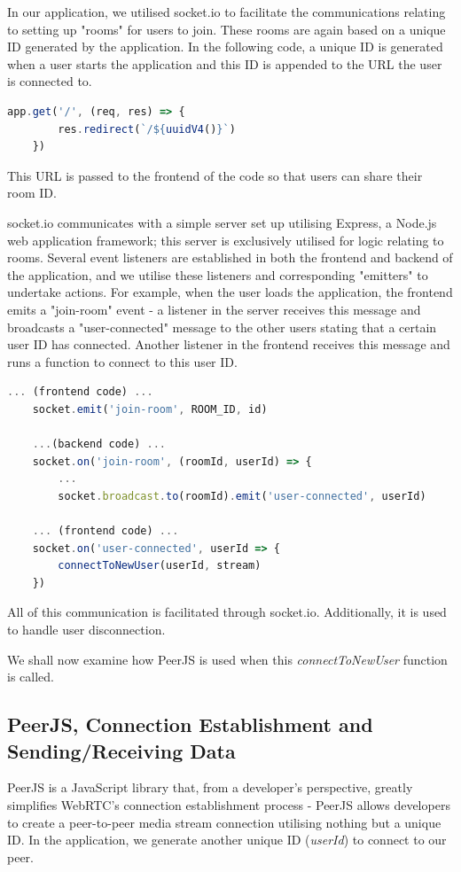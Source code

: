 In our application, we utilised socket.io to facilitate the communications relating to setting up "rooms" for users to join. These rooms are again based on a unique ID generated by the application. In the following code, a unique ID is generated when a user starts the application and this ID is appended to the URL the user is connected to.

\begin{lstlisting}[language=javascript, caption={A unique ID is generated and added to the user's connected URL.}, label=lst:callahan]
    app.get('/', (req, res) => {
        res.redirect(`/${uuidV4()}`)
    })
\end{lstlisting}

This URL is passed to the frontend of the code so that users can share their room ID.

socket.io communicates with a simple server set up utilising Express, a Node.js web application framework; this server is exclusively utilised for logic relating to rooms. Several event listeners are established in both the frontend and backend of the application, and we utilise these listeners and corresponding "emitters" to undertake actions. For example, when the user loads the application, the frontend emits a "join-room" event - a listener in the server receives this message and broadcasts a "user-connected" message to the other users stating that a certain user ID has connected. Another listener in the frontend receives this message and runs a function to connect to this user ID. 

\begin{lstlisting}[language=javascript, caption={socket.io facilitated communications.}, label=lst:callahan]
    ... (frontend code) ...
    socket.emit('join-room', ROOM_ID, id)
    
    ...(backend code) ...
    socket.on('join-room', (roomId, userId) => {
        ...
        socket.broadcast.to(roomId).emit('user-connected', userId)
        
    ... (frontend code) ...
    socket.on('user-connected', userId => {
        connectToNewUser(userId, stream)
    })
\end{lstlisting}

All of this communication is facilitated through socket.io. Additionally, it is used to handle user disconnection.

We shall now examine how PeerJS is used when this \textit{connectToNewUser} function is called.

\subsection{PeerJS, Connection Establishment and Sending/Receiving Data}
PeerJS is a JavaScript library that, from a developer's perspective, greatly simplifies WebRTC's connection establishment process - PeerJS allows developers to create a peer-to-peer media stream connection utilising nothing but a unique ID.  In the application, we generate another unique ID (\textit{userId}) to connect to our peer.

